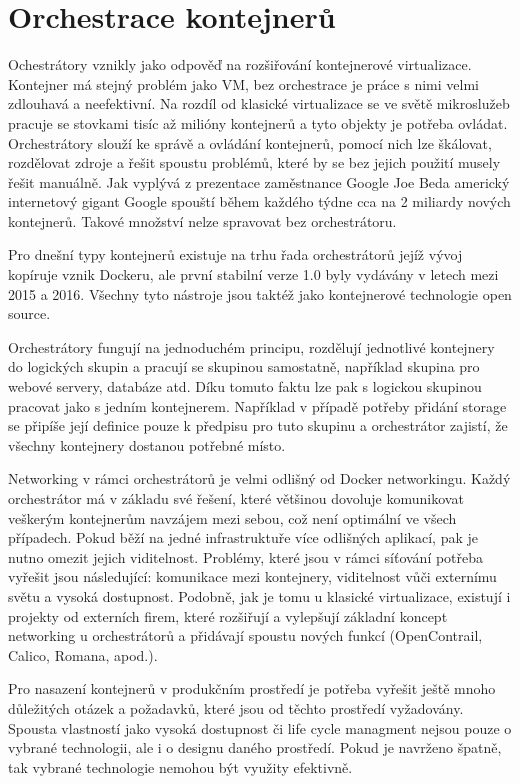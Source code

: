 \chapter{Orchestrace kontejnerů}
Ochestrátory vznikly jako odpověď na rozšiřování kontejnerové virtualizace. Kontejner má stejný problém jako VM, bez orchestrace je práce s nimi velmi zdlouhavá a neefektivní. Na rozdíl od klasické virtualizace se ve světě mikroslužeb pracuje se stovkami tisíc až milióny kontejnerů a tyto objekty je potřeba ovládat. Orchestrátory slouží ke správě a ovládání kontejnerů, pomocí nich lze škálovat, rozdělovat zdroje a řešit spoustu problémů, které by se bez jejich použití musely řešit manuálně. Jak vyplývá z prezentace zaměstnance Google Joe Beda americký internetový gigant Google\cite{beda_prez} spouští během každého týdne cca na 2 miliardy nových kontejnerů. Takové množství nelze spravovat bez orchestrátoru. 

Pro dnešní typy kontejnerů existuje na trhu řada orchestrátorů jejíž vývoj kopíruje vznik Dockeru, ale první stabilní verze 1.0 byly vydávány v letech mezi 2015 a 2016\cite{docker_1_0}. Všechny tyto nástroje jsou taktéž jako kontejnerové technologie open source.

Orchestrátory fungují na jednoduchém principu, rozdělují jednotlivé kontejnery do logických skupin a pracují se skupinou samostatně, například  skupina pro webové servery, databáze atd. Díku tomuto faktu lze pak s logickou skupinou pracovat jako s jedním kontejnerem. Například v případě potřeby přidání  storage se připíše její definice pouze k předpisu pro tuto skupinu a orchestrátor zajistí, že všechny kontejnery dostanou potřebné místo.

Networking v rámci orchestrátorů je velmi odlišný od Docker networkingu. Každý orchestrátor má v základu své řešení, které většinou dovoluje komunikovat veškerým kontejnerům navzájem mezi sebou, což není optimální ve všech případech. Pokud běží na jedné infrastruktuře více odlišných aplikací, pak je nutno omezit jejich viditelnost. Problémy, které jsou v rámci síťování potřeba vyřešit jsou následující: komunikace mezi kontejnery, viditelnost vůči externímu světu a vysoká dostupnost\cite{K8S_micro}. Podobně, jak je tomu u klasické virtualizace, existují i projekty od externích firem, které rozšiřují a vylepšují základní koncept networking u orchestrátorů a přidávají spoustu nových funkcí (OpenContrail, Calico, Romana, apod.).

Pro nasazení kontejnerů v produkčním prostředí je potřeba vyřešit ještě mnoho důležitých otázek a požadavků, které jsou od těchto prostředí vyžadovány. Spousta vlastností jako vysoká dostupnost či life cycle managment nejsou pouze o vybrané technologii, ale i o designu daného prostředí. Pokud je navrženo špatně, tak vybrané technologie nemohou být využity efektivně. 

